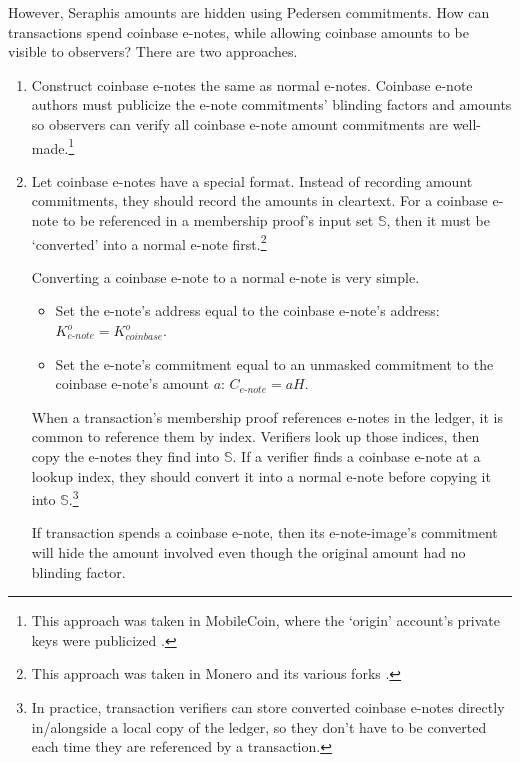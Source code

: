 However, Seraphis amounts are hidden using Pedersen commitments. How can transactions spend coinbase e-notes, while allowing coinbase amounts to be visible to observers? There are two approaches.

\begin{enumerate}
    \item Construct coinbase e-notes the same as normal e-notes. Coinbase e-note authors must publicize the e-note commitments' blinding factors and amounts so observers can verify all coinbase e-note amount commitments are well-made.\footnote{This approach was taken in MobileCoin, where the `origin' account's private keys were publicized \cite{mobilecoin-governance-fees-supply}.}

    \item Let coinbase e-notes have a special format. Instead of recording amount commitments, they should record the amounts in cleartext. For a coinbase e-note to be referenced in a membership proof's input set $\mathbb{S}$, then it must be `converted' into a normal e-note first.\footnote{This approach was taken in Monero and its various forks \cite{ztm-2}.}

    Converting a coinbase e-note to a normal e-note is very simple.
    \begin{itemize}
        \item Set the e-note's address equal to the coinbase e-note's address: $K^o_{e\textrm{-}note} = K^o_{coinbase}$.
        \item Set the e-note's commitment equal to an unmasked commitment to the coinbase e-note's amount $a$: $C_{e\textrm{-}note} = a H$.
    \end{itemize}

    When a transaction's membership proof references e-notes in the ledger, it is common to reference them by index. Verifiers look up those indices, then copy the e-notes they find into $\mathbb{S}$. If a verifier finds a coinbase e-note at a lookup index, they should convert it into a normal e-note before copying it into $\mathbb{S}$.\footnote{In practice, transaction verifiers can store converted coinbase e-notes directly in/alongside a local copy of the ledger, so they don't have to be converted each time they are referenced by a transaction.}

    If transaction spends a coinbase e-note, then its e-note-image's commitment will hide the amount involved even though the original amount had no blinding factor.
\end{enumerate}



